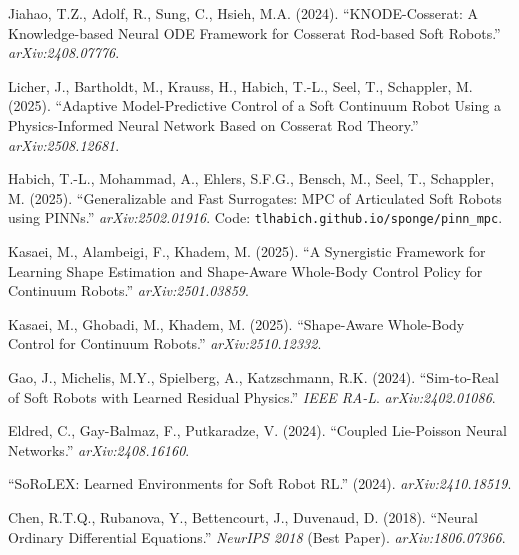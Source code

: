 \documentclass[11pt]{article}
\begin{document}
\begin{enumerate}[label={[\arabic*]}, leftmargin=2em, nosep, itemsep=0.3em]
  \item \label{ref:hsieh} Jiahao, T.Z., Adolf, R., Sung, C., Hsieh, M.A. (2024). ``KNODE-Cosserat: A Knowledge-based Neural ODE Framework for Cosserat Rod-based Soft Robots.'' \textit{arXiv:2408.07776}. \label{cite:knode}

  \item \label{ref:licher} Licher, J., Bartholdt, M., Krauss, H., Habich, T.-L., Seel, T., Schappler, M. (2025). ``Adaptive Model-Predictive Control of a Soft Continuum Robot Using a Physics-Informed Neural Network Based on Cosserat Rod Theory.'' \textit{arXiv:2508.12681}. \label{cite:ddpinn}

  \item \label{ref:habich} Habich, T.-L., Mohammad, A., Ehlers, S.F.G., Bensch, M., Seel, T., Schappler, M. (2025). ``Generalizable and Fast Surrogates: MPC of Articulated Soft Robots using PINNs.'' \textit{arXiv:2502.01916}. Code: \texttt{tlhabich.github.io/sponge/pinn\_mpc}. \label{cite:habich}

  \item \label{ref:kasaei1} Kasaei, M., Alambeigi, F., Khadem, M. (2025). ``A Synergistic Framework for Learning Shape Estimation and Shape-Aware Whole-Body Control Policy for Continuum Robots.'' \textit{arXiv:2501.03859}. \label{cite:kasaei1}

  \item \label{ref:kasaei2} Kasaei, M., Ghobadi, M., Khadem, M. (2025). ``Shape-Aware Whole-Body Control for Continuum Robots.'' \textit{arXiv:2510.12332}. \label{cite:kasaei2}

  \item \label{ref:gao} Gao, J., Michelis, M.Y., Spielberg, A., Katzschmann, R.K. (2024). ``Sim-to-Real of Soft Robots with Learned Residual Physics.'' \textit{IEEE RA-L}. \textit{arXiv:2402.01086}. \label{cite:gao}

  \item \label{ref:clpnets} Eldred, C., Gay-Balmaz, F., Putkaradze, V. (2024). ``Coupled Lie-Poisson Neural Networks.'' \textit{arXiv:2408.16160}. \label{cite:clpnets}

  \item \label{ref:sorolex} ``SoRoLEX: Learned Environments for Soft Robot RL.'' (2024). \textit{arXiv:2410.18519}. \label{cite:sorolex}

  \item \label{ref:chen} Chen, R.T.Q., Rubanova, Y., Bettencourt, J., Duvenaud, D. (2018). ``Neural Ordinary Differential Equations.'' \textit{NeurIPS 2018} (Best Paper). \textit{arXiv:1806.07366}. \label{cite:node}


\end{enumerate}
\end{document}
